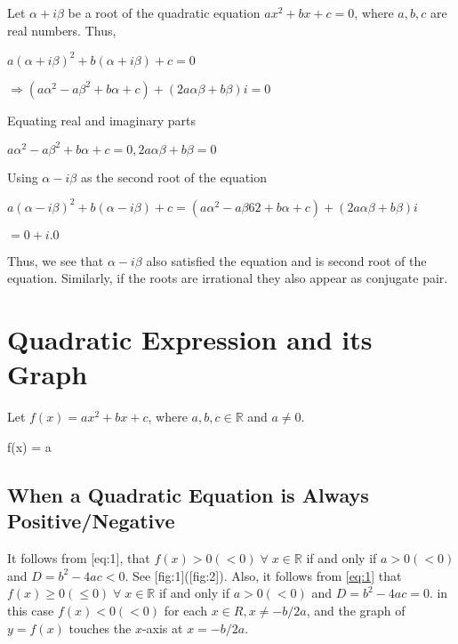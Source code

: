 Let $\alpha + i\beta$ be a root of the quadratic equation $ax^2 + bx + c = 0$, where $a, b, c$ are real numbers. Thus,

$a(\alpha + i\beta)^2 + b(\alpha + i\beta) + c = 0$

$\Rightarrow (a\alpha^2 - a\beta^2 + b\alpha + c) + (2a\alpha\beta + b\beta)i = 0$

Equating real and imaginary parts

$a\alpha^2 - a\beta^2 + b\alpha + c = 0, 2a\alpha\beta + b\beta = 0$

Using $\alpha - i\beta$ as the second root of the equation

$a(\alpha - i\beta)^2 + b(\alpha - i\beta) + c = (a\alpha^2 - a\beta62 + b\alpha + c) + (2a\alpha\beta + b\beta)i$

$= 0 + i.0$

Thus, we see that $\alpha - i\beta$ also satisfied the equation and is second root of the equation. Similarly, if the roots are
irrational they also appear as conjugate pair.

\section{Quadratic Expression and its Graph}
Let $f(x) = ax^2 + bx + c$, where $a, b, c\in\mathbb{R}$ and $a\neq 0$.

\placeformula[eq:1]
\startformula
  f(x) = a
\stopformula

\subsection{When a Quadratic Equation is Always Positive/Negative}
It follows from [eq:1], that $f(x) > 0(< 0)\;\forall\;x\in\mathbb{R}$ if and only if $a > 0(< 0)$ and $D = b^2 - 4ac <
0$. See [fig:1]([fig:2]). Also, it follows from \ref{eq:1} that $f(x) \geq 0(\leq 0)\;\forall\;x\in\mathbb{R}$ if
and only if $a > 0(< 0)$ and $D = b^2 - 4ac = 0$. in this case $f(x) < 0(< 0)$ for each $x\in R, x\neq -b/2a$, and the graph of $y
= f(x)$ touches the $x$-axis at $x = -b/2a$.

\startplacefigure[title={When quadratic equation is always positive}, reference=fig:1]
\stopplacefigure

\startplacefigure[title={When quadratic equation is always negative}, reference=fig:2]
\stopplacefigure


